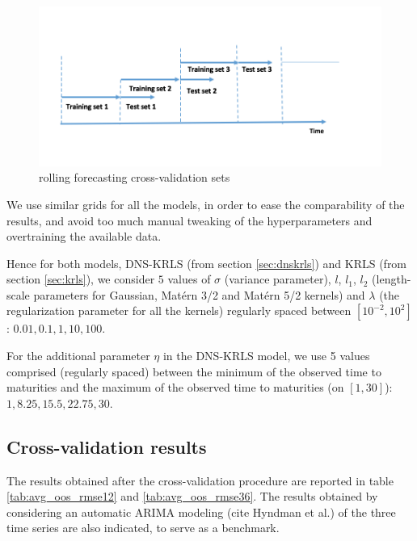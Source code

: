 \begin{figure}[!htb]
\centering
\includegraphics[width=13.5cm]{gfx/chapter-krls-models/rolling_cv}
\caption{rolling forecasting cross-validation sets}
\label{rolling_cv}
\end{figure}


We use similar grids for all the models, in order to ease the comparability of the results, and avoid too much manual tweaking of the hyperparameters and overtraining the available data. 

\medskip

Hence for both models, DNS-KRLS (from section \ref{sec:dnskrls}) and KRLS (from section \ref{sec:krls}), we consider $5$ values of $\sigma$ (variance parameter), $l$, $l_1$, $l_2$ (length-scale parameters for Gaussian, Mat\'ern 3/2 and Mat\'ern 5/2 kernels) and $\lambda$ (the regularization parameter for all the kernels) regularly spaced between $\left[ 10^{-2}, 10^2\right]$: $0.01, 0.1, 1, 10, 100$. 

\medskip

For the additional parameter $\eta$ in the DNS-KRLS model, we use 5 values comprised (regularly spaced) between the minimum of the observed time to maturities  and the maximum of the observed time to maturities (on $\left[1, 30\right]$): $1, 8.25, 15.5, 22.75, 30$.


\subsection{Cross-validation results}

The results obtained after the cross-validation procedure are reported in table \ref{tab:avg_oos_rmse12} and \ref{tab:avg_oos_rmse36}. The results obtained by considering an automatic ARIMA modeling (cite Hyndman et al.) of the three time series are also indicated, to serve as a benchmark. 

